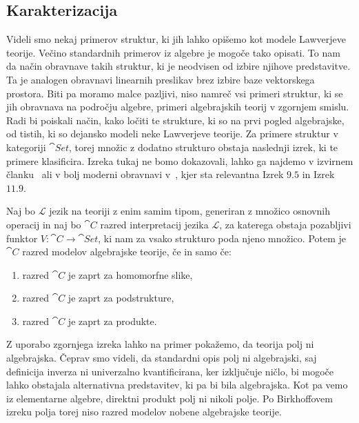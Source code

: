\documentclass[../kategoricna_logika.tex]{subfiles}
\begin{document}
\subsection{Karakterizacija}
\label{subsec:karakterizacija-lawverjevih-teorij}
%
%
Videli smo nekaj primerov struktur, ki jih lahko opišemo kot modele
Lawverjeve teorije. Večino standardnih primerov iz algebre je mogoče
tako opisati. To nam da način obravnave takih struktur,
ki je neodvisen od izbire njihove predstavitve.
Ta je analogen obravnavi linearnih preslikav brez izbire baze vektorskega
prostora. Biti pa moramo malce pazljivi, niso namreč
vsi primeri struktur, ki se jih obravnava na področju algebre, primeri
algebrajskih teorij v zgornjem smislu. Radi bi poiskali način, kako ločiti te
strukture, ki so na prvi pogled algebrajske, od tistih, ki so dejansko
modeli neke Lawverjeve teorije. Za primere struktur v kategoriji $\cat{Set}$,
torej množic z dodatno strukturo obstaja naslednji izrek, ki te
primere klasificira. Izreka tukaj ne bomo dokazovali, lahko ga najdemo v
izvirnem članku~\cite{birkhoff_1935} ali v bolj moderni obravnavi v~\cite{cohn1981universal},
kjer sta relevantna Izrek $9.5$ in Izrek $11.9$.
\begin{izrek}\label{izrek:Birkhoff-HSP}
  Naj bo $\mathcal{L}$ jezik na teoriji z enim samim tipom, generiran z množico
  osnovnih operacij in naj bo $\cat{C}$ razred interpretacij jezika $\mathcal{L}$,
  za katerega obstaja pozabljivi funktor $V : \cat{C} \to \cat{Set}$, ki nam za
  vsako strukturo poda njeno množico. Potem je $\cat{C}$ razred modelov
  algebrajske teorije, če in samo če:
  \begin{enumerate}
  \item razred $\cat{C}$ je zaprt za homomorfne slike,
  \item razred $\cat{C}$ je zaprt za podstrukture, 
  \item razred $\cat{C}$ je zaprt za produkte.
  \end{enumerate}
\end{izrek}
%
\begin{primer}
  Z uporabo zgornjega izreka lahko na primer pokažemo, da teorija polj ni algebrajska.
  Čeprav smo videli, da standardni opis polj ni algebrajski, saj definicija inverza
  ni univerzalno kvantificirana, ker izključuje ničlo, bi mogoče lahko obstajala
  alternativna predstavitev, ki pa bi bila algebrajska. Kot pa vemo iz elementarne
  algebre, direktni produkt polj ni nikoli polje. Po Birkhoffovem izreku polja
  torej niso razred modelov nobene algebrajske teorije.
\end{primer}
\end{document}
